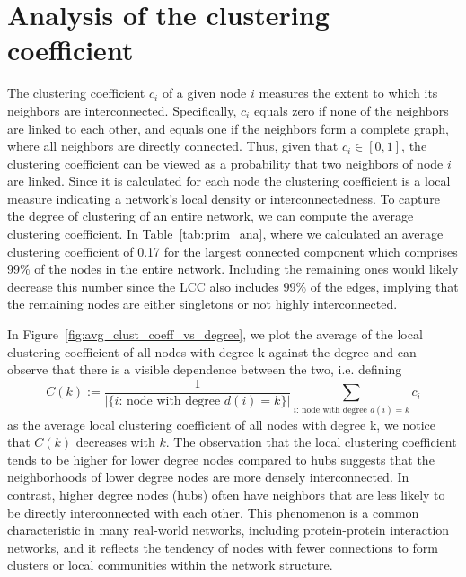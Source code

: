 \documentclass[paper=a4,fontsize=11pt,DIV=8,BCOR=5mm,oneside,pdftex,bibtotocnumbered]{scrreprt}
\theoremstyle{plain}
\begin{document}
	\section{Analysis of the clustering coefficient}
	The clustering coefficient $c_i$ of a given node $i$ measures the extent to which its neighbors are interconnected. Specifically, $c_i$ equals zero if none of the neighbors are linked to each other, and equals one if the neighbors form a complete graph, where all neighbors are directly connected. Thus, given that $c_i \in [0,1]$, the clustering coefficient can be viewed as a probability that two neighbors of node $i$ are linked. Since it is calculated for each node the clustering coefficient is a local measure indicating a network's local density or interconnectedness. To capture the degree of clustering of an entire network, we can compute the average clustering coefficient. In Table~\ref{tab:prim_ana}, where we calculated an average clustering coefficient of 0.17 for the largest connected component which comprises 99\% of the nodes in the entire network. Including the remaining ones would likely decrease this number since the LCC also includes 99\% of the edges, implying that the remaining nodes are either singletons or not highly interconnected.
	
	In Figure~\ref{fig:avg_clust_coeff_vs_degree}, we plot the average of the local clustering coefficient of all nodes with degree k against the degree and can observe that there is a visible dependence between the two, i.e. defining 
	\[
		C(k) := \frac{1}{|\{i\text{: node with degree } d(i)=k\}|}\sum_{i\text{: node with degree } d(i)=k} c_i
	\] 
	as the average local clustering coefficient of all nodes with degree k, we notice that $C(k)$ decreases with $k$. The observation that the local clustering coefficient tends to be higher for lower degree nodes compared to hubs suggests that the neighborhoods of lower degree nodes are more densely interconnected. In contrast, higher degree nodes (hubs) often have neighbors that are less likely to be directly interconnected with each other. This phenomenon is a common characteristic in many real-world networks, including protein-protein interaction networks, and it reflects the tendency of nodes with fewer connections to form clusters or local communities within the network structure.
	
\end{document}
